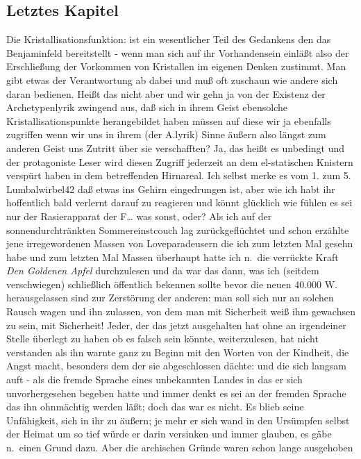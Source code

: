 \documentclass[
]{article}
\author{}
\date{\vspace{-2.5em}}
\begin{document}
\subsection{Letztes Kapitel}\label{letztes-kapitel}

Die Kristallisationsfunktion: ist ein wesentlicher Teil des Gedankens
den das Benjaminfeld bereitstellt - wenn man sich auf ihr Vorhandensein
einläßt also der Erschließung der Vorkommen von Kristallen im eigenen
Denken zustimmt. Man gibt etwas der Verantwortung ab dabei und muß oft
zuschaun wie andere sich daran bedienen. Heißt das nicht aber und wir
gehn ja von der Existenz der Archetypenlyrik zwingend aus, daß sich in
ihrem Geist ebensolche Kristallisationspunkte herangebildet haben müssen
auf diese wir ja ebenfalls zugriffen wenn wir uns in ihrem (der A.lyrik)
Sinne äußern also längst zum anderen Geist uns Zutritt über sie
verschafften? Ja, das heißt es unbedingt und der protagoniste Leser wird
diesen Zugriff jederzeit an dem el-statischen Knistern verspürt haben in
dem betreffenden Hirnareal. Ich selbst merke es vom 1. zum 5.
Lumbalwirbel42 daß etwas ins Gehirn eingedrungen ist, aber wie ich habt
ihr hoffentlich bald verlernt darauf zu reagieren und könnt glücklich
wie fühlen es sei nur der Rasierapparat der F\ldots{} was sonst, oder?
Als ich auf der sonnendurchtränkten Sommereinstcouch lag
zurückgeflüchtet und schon erzählte jene irregewordenen Massen von
Loveparadeusern die ich zum letzten Mal gesehn habe und zum letzten Mal
Massen überhaupt hatte ich n.~die verrückte Kraft \emph{Den Goldenen
Apfel} durchzulesen und da war das dann, was ich (seitdem verschwiegen)
schließlich öffentlich bekennen sollte bevor die neuen 40.000 W.
herausgelassen sind zur Zerstörung der anderen: man soll sich nur an
solchen Rausch wagen und ihn zulassen, von dem man mit Sicherheit weiß
ihm gewachsen zu sein, mit Sicherheit! Jeder, der das jetzt ausgehalten
hat ohne an irgendeiner Stelle überlegt zu haben ob es falsch sein
könnte, weiterzulesen, hat nicht verstanden als ihn warnte ganz zu
Beginn mit den Worten von der Kindheit, die Angst macht, besonders dem
der sie abgeschlossen dächte: und die sich langsam auft - als die fremde
Sprache eines unbekannten Landes in das er sich unvorhergesehen begeben
hatte und immer denkt es sei an der fremden Sprache das ihn ohnmächtig
werden läßt; doch das war es nicht. Es blieb seine Unfähigkeit, sich in
ihr zu äußern; je mehr er sich wand in den Ursümpfen selbst der Heimat
um so tief würde er darin versinken und immer glauben, es gäbe n.~einen
Grund dazu. Aber die archischen Gründe waren schon lange ausgehoben
\end{document}
